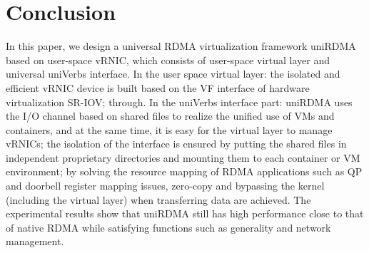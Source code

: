 \documentclass[sigplan,screen]{acmart}
\begin{document}
\section{Conclusion}
In this paper, we design a universal RDMA virtualization framework uniRDMA based on user-space vRNIC, which consists of user-space virtual layer and universal uniVerbs interface. In the user space virtual layer: the isolated and efficient vRNIC device is built based on the VF interface of hardware virtualization SR-IOV; through. In the uniVerbs interface part: uniRDMA uses the I/O channel based on shared files to realize the unified use of VMs and containers, and at the same time, it is easy for the virtual layer to manage vRNICs; the isolation of the interface is ensured by putting the shared files in independent proprietary directories and mounting them to each container or VM environment; by solving the resource mapping of RDMA applications such as QP and doorbell register mapping issues, zero-copy and bypassing the kernel (including the virtual layer) when transferring data are achieved. The experimental results show that uniRDMA still has high performance close to that of native RDMA while satisfying functions such as generality and network management.
\end{document}
